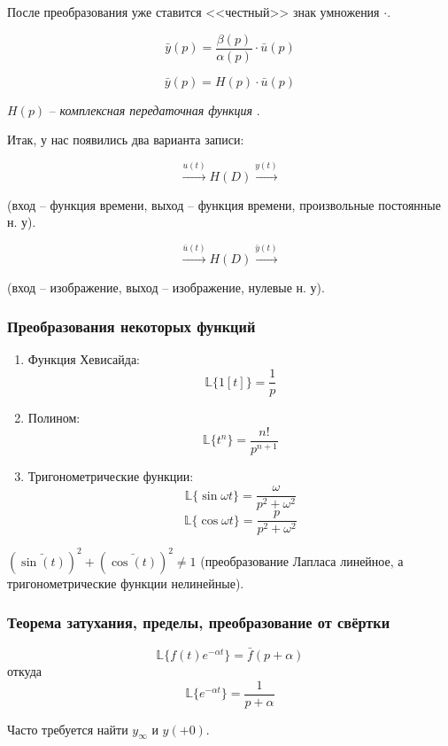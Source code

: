 \documentclass[main.tex]{subfiles}
\begin{document}
После преобразования уже ставится <<честный>> знак умножения $ \cdot $.

\[ \bar y(p) = \frac{\beta(p)}{\alpha(p)} \cdot \bar u(p) \]

\begin{equation}\label{eq:transmit_func}
    \boxed{\bar{y}(p) = H(p) \cdot \bar{u}(p) }
\end{equation}

$ H(p) $ -- \emph{ комплексная передаточная функция }.

Итак, у нас появились два варианта записи:

$$ \xrightarrow{u(t)} \boxed{H(D)}\xrightarrow{y(t)} $$

(вход -- функция времени, выход -- функция времени, произвольные постоянные н. у).

$$ \xrightarrow{\bar u(t)} \boxed{H(D)} \xrightarrow{ \bar y(t)} $$

(вход -- изображение, выход -- изображение, нулевые н. у).

\subsubsection{Преобразования некоторых функций}

\begin{enumerate}[noitemsep]
    \item Функция Хевисайда:
    \[ \mathds{L} \{ 1[t] \} = \frac{1}{p} \]
    \item Полином:
    \[ \mathds{L}\{ t^n \} = \frac{n!}{p^{n+1}} \]
    \item Тригонометрические функции:
    \[ \mathds{L}\{ \sin \omega t \} = \frac{\omega}{p^2 + \omega^2} \]
    \[ \mathds{L}\{ \cos \omega t \} = \frac{p}{p^2 + \omega^2} \]

\end{enumerate}

$ (\bar{\sin(t)})^2 + (\bar{\cos(t)})^2 \ne 1 $ (преобразование Лапласа линейное, а тригонометрические функции нелинейные).

\subsubsection{ Теорема затухания, пределы, преобразование от свёртки }

\[ \mathds{L}\{ f(t)e^{- \alpha t} \} = \bar f(p+\alpha) \]
откуда
\[ \mathds{L}\{ e^{- \alpha t} \} = \frac{1}{p+\alpha} \]

Часто требуется найти $ y_\infty $ и $ y(+0) $.
\end{document}
